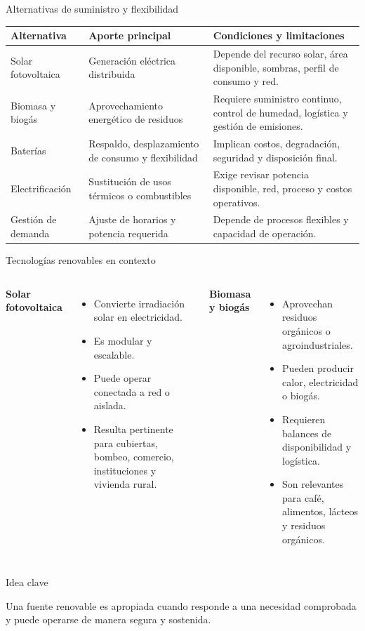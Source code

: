 \documentclass[aspectratio=169,10pt]{beamer}
\newcommand{\idea}[1]{
\begin{block}{Idea clave}
#1
\end{block}
}
\begin{document}
\begin{frame}{Alternativas de suministro y flexibilidad}
\begin{table}
\centering
\small
\begin{tabular}{p{} p{} p{}}
\toprule
\textbf{Alternativa} & \textbf{Aporte principal} & \textbf{Condiciones y limitaciones} \\
\midrule
Solar fotovoltaica & Generación eléctrica distribuida & Depende del recurso solar, área disponible, sombras, perfil de consumo y red. \\
\addlinespace
Biomasa y biogás & Aprovechamiento energético de residuos & Requiere suministro continuo, control de humedad, logística y gestión de emisiones. \\
\addlinespace
Baterías & Respaldo, desplazamiento de consumo y flexibilidad & Implican costos, degradación, seguridad y disposición final. \\
\addlinespace
Electrificación & Sustitución de usos térmicos o combustibles & Exige revisar potencia disponible, red, proceso y costos operativos. \\
\addlinespace
Gestión de demanda & Ajuste de horarios y potencia requerida & Depende de procesos flexibles y capacidad de operación. \\
\bottomrule
\end{tabular}
\end{table}
\end{frame}

\begin{frame}{Tecnologías renovables en contexto}
\begin{columns}
\textbf{Solar fotovoltaica}
\begin{itemize}
    \item Convierte irradiación solar en electricidad.
    \item Es modular y escalable.
    \item Puede operar conectada a red o aislada.
    \item Resulta pertinente para cubiertas, bombeo, comercio, instituciones y vivienda rural.
\end{itemize}

\textbf{Biomasa y biogás}
\begin{itemize}
    \item Aprovechan residuos orgánicos o agroindustriales.
    \item Pueden producir calor, electricidad o biogás.
    \item Requieren balances de disponibilidad y logística.
    \item Son relevantes para café, alimentos, lácteos y residuos orgánicos.
\end{itemize}
\end{columns}

\vspace{0.4cm}

\idea{
Una fuente renovable es apropiada cuando responde a una necesidad comprobada y puede operarse de manera segura y sostenida.
}
\end{frame}
\end{document}
